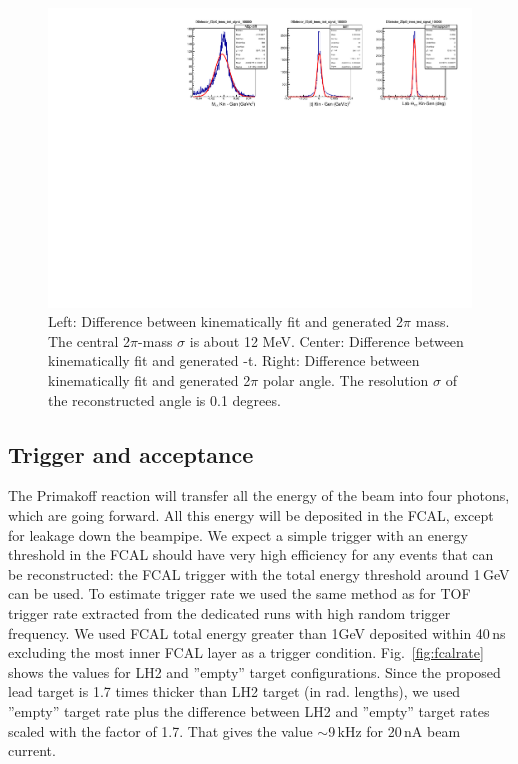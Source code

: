 \begin{figure}[tph]
\centering
\includegraphics[width=6in]{figures/Resolution_Mpipittag_signal_DSelector.pdf}
\caption{Left: Difference between kinematically fit and generated 2$\pi$ mass. The central 2$\pi$-mass $\sigma$ is about 12 MeV. Center: Difference between kinematically fit and generated -t. Right: Difference between kinematically fit and generated 2$\pi$ polar angle. The resolution $\sigma$ of the reconstructed angle is 0.1 degrees.
\label{fig:Resolution_Mpipittag_signal_DSelector}}
\end{figure}

\subsection{Trigger and acceptance}
The Primakoff reaction will transfer all the energy of the beam into
four photons, which are going forward. All this energy will be
deposited in the FCAL, except for leakage down the beampipe. We expect
a simple trigger with an energy threshold in the FCAL should have very
high efficiency for any events that can be reconstructed:
the FCAL trigger with the total energy threshold around 1$\,$GeV can be used. To estimate trigger rate we used the same method as for TOF trigger rate \cite{TOFrate} extracted from the dedicated runs with high random trigger frequency. We used FCAL total energy greater than 1GeV deposited within 40$\,$ns excluding the most inner FCAL layer as a trigger condition. Fig.~\ref{fig:fcalrate} shows the values for LH2 and ''empty'' target configurations.
Since the proposed lead target is 1.7 times thicker than LH2 target (in rad. lengths), we used ''empty'' target rate plus the difference between LH2 and ''empty'' target rates scaled with the factor of 1.7. That gives the value $\sim$9$\,$kHz for 20$\,$nA beam current.

